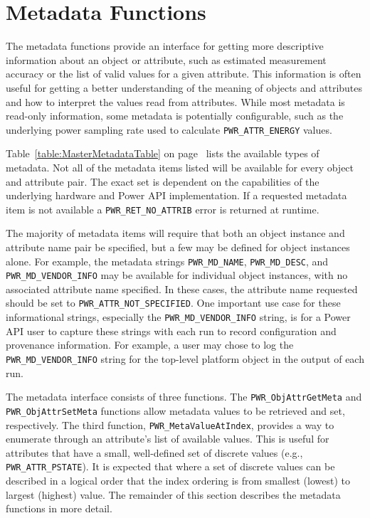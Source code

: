 \section{Metadata Functions}\label{sec:METADATA}

The metadata functions provide an interface for getting more descriptive
information about an object or attribute, such as estimated measurement
accuracy or the list of valid values for a given attribute.  This
information is often useful for getting a better understanding of the
meaning of objects and attributes and how to interpret the values read
from attributes.  While most metadata is read-only information, some
metadata is potentially configurable, such as the underlying power
sampling rate used to calculate \texttt{PWR_ATTR_ENERGY} values.

Table~\ref{table:MasterMetadataTable} on page~\pageref{type:AttrStat} 
lists the available types of metadata. Not all of the metadata items
listed will be available for every object and attribute pair.  The exact
set is dependent on the capabilities of the underlying hardware and
Power API implementation. If a requested metadata item is not available
a \texttt{PWR_RET_NO_ATTRIB} error is returned at runtime.

The majority
of metadata items will require that both an object instance and
attribute name pair be specified, but a few may be defined for object
instances alone.  For example, the metadata strings \texttt{PWR\_MD\_NAME},
\texttt{PWR\_MD\_DESC}, and \texttt{PWR\_MD\_VENDOR\_INFO} may be
available for individual object instances, with no associated attribute
name specified.  In these cases, the attribute name requested should
be set to \texttt{PWR_ATTR_NOT_SPECIFIED}. One important use case for
these informational strings, especially the \texttt{PWR\_MD\_VENDOR\_INFO}
string, is for a Power API user to capture these strings with each run
to record configuration and provenance information.  For example, a
user may chose to log the \texttt{PWR\_MD\_VENDOR\_INFO} string for
the top-level platform object in the output of each run.

The metadata interface consists of three functions. The
\texttt{PWR_ObjAttrGetMeta} and \texttt{PWR_ObjAttrSetMeta} functions allow
metadata values to be retrieved and set, respectively. The third function,
\texttt{PWR_MetaValueAtIndex}, provides a way to enumerate through an attribute's
list of available values.  This is useful for attributes that have a small, well-defined
set of discrete values (e.g., \texttt{PWR\_ATTR\_PSTATE}). It is expected that where 
a set of discrete values can be described in a logical order that the index ordering
is from smallest (lowest) to largest (highest) value. The remainder of
this section describes the metadata functions in more detail.

